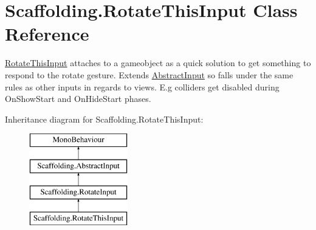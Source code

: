 \hypertarget{class_scaffolding_1_1_rotate_this_input}{\section{Scaffolding.\+Rotate\+This\+Input Class Reference}
\label{class_scaffolding_1_1_rotate_this_input}
}


\hyperlink{class_scaffolding_1_1_rotate_this_input}{Rotate\+This\+Input} attaches to a gameobject as a quick solution to get something to respond to the rotate gesture. Extends \hyperlink{class_scaffolding_1_1_abstract_input}{Abstract\+Input} so falls under the same rules as other inputs in regards to views. E.\+g colliders get disabled during On\+Show\+Start and On\+Hide\+Start phases.  


Inheritance diagram for Scaffolding.\+Rotate\+This\+Input\+:\begin{figure}[H]
\begin{center}
\leavevmode
\includegraphics[height=4.000000cm]{class_scaffolding_1_1_rotate_this_input}
\end{center}
\end{figure}
